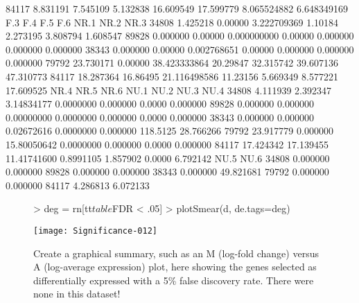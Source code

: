 \documentclass{article}
\begin{document}
\begin{Schunk}
\begin{Soutput}
84117  8.831191  7.545109  5.132838 16.609549 17.599779 8.065524882 6.648349169
            F.3      F.4          F.5      F.6      NR.1      NR.2      NR.3
34808  1.425218  0.00000  3.222709369  1.10184  2.273195  3.808794  1.608547
89828  0.000000  0.00000  0.000000000  0.00000  0.000000  0.000000  0.000000
38343  0.000000  0.00000  0.002768651  0.00000  0.000000  0.000000  0.000000
79792 23.730171  0.00000 38.423333864 20.29847 32.315742 39.607136 47.310773
84117 18.287364 16.86495 21.116498586 11.23156  5.669349  8.577221 17.609525
           NR.4      NR.5        NR.6      NU.1     NU.2     NU.3      NU.4
34808  4.111939  2.392347  3.14834177 0.0000000 0.000000   0.0000  0.000000
89828  0.000000  0.000000  0.00000000 0.0000000 0.000000   0.0000  0.000000
38343  0.000000  0.000000  0.02672616 0.0000000 0.000000 118.5125 28.766266
79792 23.917779  0.000000 15.80050642 0.0000000 0.000000   0.0000  0.000000
84117 17.424342 17.139455 11.41741600 0.8991105 1.857902   0.0000  6.792142
          NU.5      NU.6
34808 0.000000  0.000000
89828 0.000000  0.000000
38343 0.000000 49.821681
79792 0.000000  0.000000
84117 4.286813  6.072133
\end{Soutput}
\end{Schunk}

\begin{figure}[H]
\centering
\begin{Schunk}
\begin{Sinput}
> deg = rn[tt$table$FDR < .05]
> plotSmear(d, de.tags=deg)
\end{Sinput}
\end{Schunk}
\texttt{[image: Significance-012]}
\caption{Create a graphical summary, such as an M (log-fold change) versus A (log-average expression) plot, here showing the genes selected as differentially expressed with a 5\% false discovery rate. There were none in this dataset!}
\label{plotSmear}
\end{figure}

\begin{Schunk}
\end{Schunk}
\end{document}
